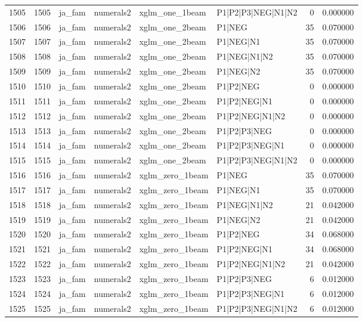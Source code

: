 \begin{tabular}{lrllllrr}
1505 & 1505 & ja_fam & numerals2 & xglm_one_1beam & P1|P2|P3|NEG|N1|N2 & 0 & 0.000000 \\
1506 & 1506 & ja_fam & numerals2 & xglm_one_2beam & P1|NEG & 35 & 0.070000 \\
1507 & 1507 & ja_fam & numerals2 & xglm_one_2beam & P1|NEG|N1 & 35 & 0.070000 \\
1508 & 1508 & ja_fam & numerals2 & xglm_one_2beam & P1|NEG|N1|N2 & 35 & 0.070000 \\
1509 & 1509 & ja_fam & numerals2 & xglm_one_2beam & P1|NEG|N2 & 35 & 0.070000 \\
1510 & 1510 & ja_fam & numerals2 & xglm_one_2beam & P1|P2|NEG & 0 & 0.000000 \\
1511 & 1511 & ja_fam & numerals2 & xglm_one_2beam & P1|P2|NEG|N1 & 0 & 0.000000 \\
1512 & 1512 & ja_fam & numerals2 & xglm_one_2beam & P1|P2|NEG|N1|N2 & 0 & 0.000000 \\
1513 & 1513 & ja_fam & numerals2 & xglm_one_2beam & P1|P2|P3|NEG & 0 & 0.000000 \\
1514 & 1514 & ja_fam & numerals2 & xglm_one_2beam & P1|P2|P3|NEG|N1 & 0 & 0.000000 \\
1515 & 1515 & ja_fam & numerals2 & xglm_one_2beam & P1|P2|P3|NEG|N1|N2 & 0 & 0.000000 \\
1516 & 1516 & ja_fam & numerals2 & xglm_zero_1beam & P1|NEG & 35 & 0.070000 \\
1517 & 1517 & ja_fam & numerals2 & xglm_zero_1beam & P1|NEG|N1 & 35 & 0.070000 \\
1518 & 1518 & ja_fam & numerals2 & xglm_zero_1beam & P1|NEG|N1|N2 & 21 & 0.042000 \\
1519 & 1519 & ja_fam & numerals2 & xglm_zero_1beam & P1|NEG|N2 & 21 & 0.042000 \\
1520 & 1520 & ja_fam & numerals2 & xglm_zero_1beam & P1|P2|NEG & 34 & 0.068000 \\
1521 & 1521 & ja_fam & numerals2 & xglm_zero_1beam & P1|P2|NEG|N1 & 34 & 0.068000 \\
1522 & 1522 & ja_fam & numerals2 & xglm_zero_1beam & P1|P2|NEG|N1|N2 & 21 & 0.042000 \\
1523 & 1523 & ja_fam & numerals2 & xglm_zero_1beam & P1|P2|P3|NEG & 6 & 0.012000 \\
1524 & 1524 & ja_fam & numerals2 & xglm_zero_1beam & P1|P2|P3|NEG|N1 & 6 & 0.012000 \\
1525 & 1525 & ja_fam & numerals2 & xglm_zero_1beam & P1|P2|P3|NEG|N1|N2 & 6 & 0.012000 \\

\end{tabular}
